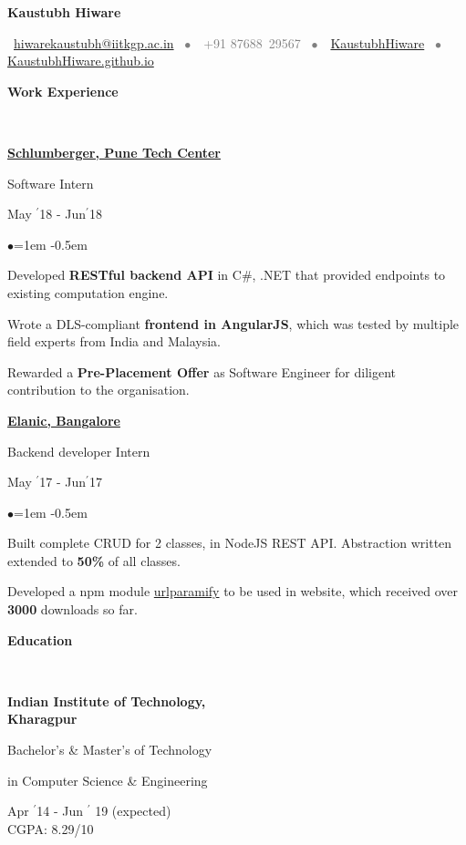 \documentclass[11pt, a4paper]{resume}
\newcommand{\important}[1]{
	\textcolor{mypurple}{#1}
}
\newcommand{\greyed}[1]{
	\textcolor{gray}{#1}
}
\newcommand{\titleX}[1]{
	\begin{LARGE}
    	\important{\centerline{\textbf{#1}}}
    \end{LARGE}
}
\newcommand{\fillit}[1]{
	\leavevmode\xleaders\hbox{#1}\hfill\kern0pt
}
\newcommand{\sectionTitle}[1]{
	\begin{Large}
    	\important{\textbf{#1}} 
    \end{Large}
    \important{\rlap{\rule[.5ex]{\linegoal}{0.5pt}}{}}
     \vspace{0.1em}\\
}
\newcommand{\textbox}[1]{
  \parbox{.333\textwidth}{#1}
}
\newenvironment{Jobsection}[3]{ %
\noindent\textbox{\bf #1\hfill}\textbox{\hfil #2\hfil}\textbox{\hfill #3}
  \begin{list}{$\bullet$}{\leftmargin=1em} %
   \itemsep -0.5em \vspace{-0.5em} %
  }{
  \end{list}
  \vspace{0.2em} %
}
\newcommand{\education}[3]{ %
\noindent\parbox{.3\textwidth}{\bf #1\hfill}\parbox{.45\textwidth}{\hfil #2\hfil}\parbox{.25\textwidth}{\hfill #3}
}
\begin{document}
\titleX{Kaustubh Hiware}
\normalsize
\vspace{6pt}
\greyed{\centerline{\faEnvelopeO \, \href{mailto:hiwarekaustubh@iitkgp.ac.in}{ hiwarekaustubh@iitkgp.ac.in} \, $\bullet$ \,\faMobile\, +91 87688\, 29567 \, $\bullet$ \,\faGithub \, \href{https://github.com/kaustubhhiware}{KaustubhHiware} \,  $\bullet$ \, \faGlobe \, \href{https://kaustubhhiware.github.io}{KaustubhHiware.github.io}}}

\vspace{-2em}
\sectionTitle{Work Experience}
\begin{Jobsection}{\href{https://drive.google.com/file/d/1EcfIC_g8bx3whaxMdOkFyZx4TCqA1RAq/view?usp=sharing}{Schlumberger, Pune Tech Center}}{Software Intern}{ May $^{\prime}$18 - Jun$^{\prime}$18}
\item Developed {\bf RESTful backend API} in C\#, .NET that provided endpoints to existing computation engine.
\item Wrote a DLS-compliant {\bf frontend in AngularJS}, which was tested  by multiple field experts from India and Malaysia.
\item Rewarded a {\bf Pre-Placement Offer} as Software Engineer for diligent contribution to the organisation.
\end{Jobsection}

\begin{Jobsection}{\href{https://drive.google.com/file/d/0B5iU6cWw36rOVWZIcllPY3RSd2c/view?usp=sharing}{Elanic, Bangalore}}{Backend developer Intern}{ May $^{\prime}$17 - Jun$^{\prime}$17}
\item Built complete CRUD for 2 classes, in NodeJS REST API. Abstraction written extended to {\bf 50\%} of all classes.
\item Developed a npm module \href{https://www.npmjs.com/package/urlparamify}{urlparamify} to be used in website, which received over {\bf 3000} downloads so far.
\end{Jobsection}

\sectionTitle{Education\vspace{0.5em}}
\education{Indian Institute of Technology,\\ Kharagpur}{\centerline{Bachelor's \& Master's of Technology} \centerline{in Computer Science \& Engineering}}{Apr $^{\prime}$14 - Jun $^{\prime}$ 19 (expected) \\\hspace*{\fill} CGPA: 8.29/10}
\end{document}
